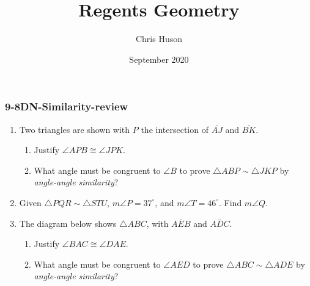 \documentclass[12pt, twoside]{article}
\title{Regents Geometry}
\author{Chris Huson}
\date{September 2020}
\begin{document}
\subsubsection*{9-8DN-Similarity-review}
\begin{enumerate}
\item Two triangles are shown with $P$ the intersection of $\overline{AJ}$ and $\overline{BK}$.
  \begin{multicols}{2}
    \begin{enumerate}
        \item Justify $\angle APB \cong \angle JPK$.
        \item What angle must be congruent to $\angle B$ to prove $\triangle ABP \sim \triangle JKP$ by \emph{angle-angle similarity}? \vspace{2cm}
        \end{enumerate}
    \end{multicols}
      \vspace{1cm}

\item Given $\triangle PQR \sim \triangle STU$, $m\angle P=37^\circ$, and $m\angle T=46^\circ$. Find $m\angle Q$. \vspace{3cm}

\item The diagram below shows $\triangle ABC$, with $\overline{AEB}$ and $\overline{ADC}$.
    \begin{multicols}{2}
      \begin{enumerate}
        \item Justify $\angle BAC \cong \angle DAE$.
        \item What angle must be congruent to $\angle AED$ to prove $\triangle ABC \sim \triangle ADE$ by \emph{angle-angle similarity}? \vspace{3cm}
      \end{enumerate}
    \end{multicols}


\end{enumerate}
\end{document}
